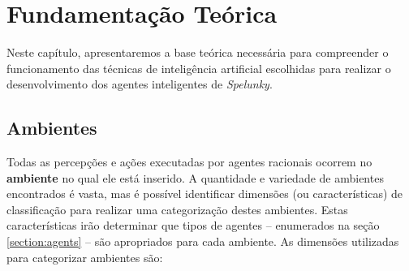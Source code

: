\chapter{\label{chap:theory}Fundamentação Teórica}
Neste capítulo, apresentaremos a base teórica necessária para compreender o
funcionamento das técnicas de inteligência artificial escolhidas para realizar o
desenvolvimento dos agentes inteligentes de \textit{Spelunky}.


\section{\label{section:environment}Ambientes}
Todas as percepções e ações executadas por agentes racionais ocorrem no
\textbf{ambiente} no qual ele está inserido. A quantidade e variedade de
ambientes encontrados é vasta, mas é possível identificar dimensões (ou
características) de classificação para realizar uma categorização destes
ambientes. Estas características irão determinar que tipos de agentes --
enumerados na seção \ref{section:agents} -- são apropriados para cada ambiente.
As dimensões utilizadas para categorizar ambientes são:

